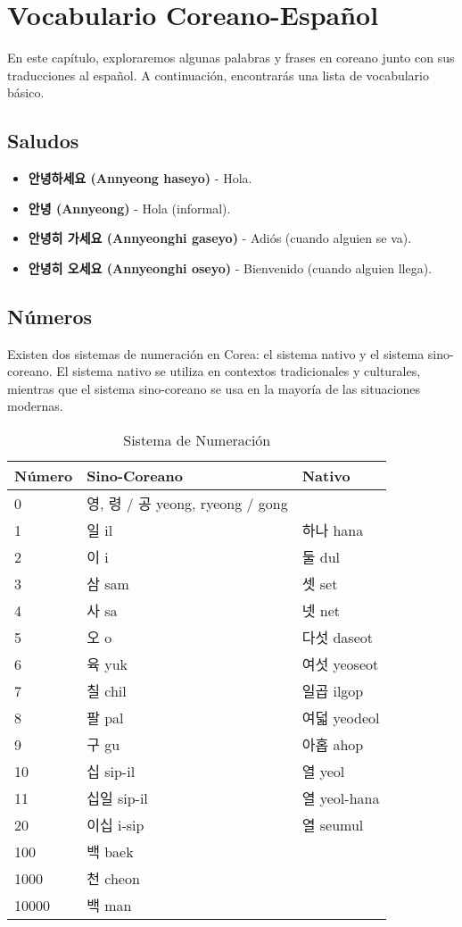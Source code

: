 \chapter{Vocabulario Coreano-Español}

En este capítulo, exploraremos algunas palabras y frases en coreano junto con sus traducciones al español. A continuación, encontrarás una lista de vocabulario básico.

\section{Saludos}

\begin{itemize}
	\item \textbf{안녕하세요 (Annyeong haseyo)} - Hola.
	\item \textbf{안녕 (Annyeong)} - Hola (informal).
	\item \textbf{안녕히 가세요 (Annyeonghi gaseyo)} - Adiós (cuando alguien se va).
	\item \textbf{안녕히 오세요 (Annyeonghi oseyo)} - Bienvenido (cuando alguien llega).
\end{itemize}

\section{Números}

Existen dos sistemas de numeración en Corea: el sistema nativo y el sistema sino-coreano. El sistema nativo se utiliza en contextos tradicionales y culturales, mientras que el sistema sino-coreano se usa en la mayoría de las situaciones modernas.

\begin{table}[t]
	\caption{Sistema de Numeración}
	\begin{center}
		\begin{tabular}{ | m{2cm} | m{5cm} | m{5cm} | }
			\hline Número & Sino-Coreano & Nativo\\ \hline
			0 & 영, 령 / 공 yeong, ryeong / gong &  \\
			1 & 일 il & 하나 hana \\
			2 & 이 i & 둘 dul \\
			3 & 삼 sam & 셋 set \\
			4 & 사 sa & 넷 net\\
			5 & 오 o & 다섯 daseot\\
			6 & 육 yuk & 여섯 yeoseot\\
			7 & 칠 chil & 일곱 ilgop\\
			8 & 팔 pal & 여덟 yeodeol \\
			9 & 구 gu & 아홉 ahop \\
			10 & 십 sip-il & 열 yeol\\
			11 & 십일 sip-il & 열 yeol-hana \\
			20 & 이십 i-sip & 열 seumul\\
			100 & 백 baek & \\
			1000 & 천 cheon & \\
			10000 & 백 man & \\ \hline
		\end{tabular}
	\end{center}
\end{table}

